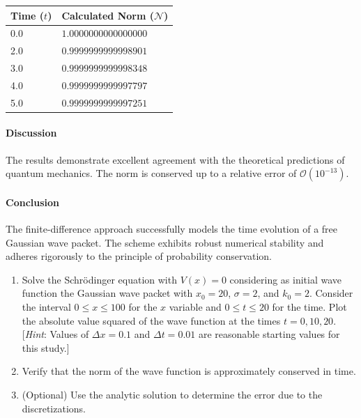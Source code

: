 \begin{solution}
	\begin{center}
		\centering
		\renewcommand{\arraystretch}{1.2}
		\begin{tabular}{ll}
			\toprule
			Time ($t$) & Calculated Norm ($\mathcal{N}$) \\
			\midrule
			0.0                 & $1.0000000000000000$                     \\
			2.0                 & $0.9999999999998901$                     \\
			3.0                 & $0.9999999999998348$                     \\
			4.0                 & $0.9999999999997797$                     \\
			5.0                 & $0.9999999999997251$                     \\
			\bottomrule
		\end{tabular}
		\label{tab:norm_conservation}
	\end{center}

	\paragraph{Discussion}
	The results demonstrate excellent agreement with the theoretical predictions of quantum
	mechanics. The norm is conserved up to a relative error of
	$\mathcal{O}(10^{-13})$.

	\paragraph{Conclusion}
	The finite-difference approach successfully models the time evolution of a
	free Gaussian wave packet. The scheme exhibits robust numerical stability and
	adheres rigorously to the principle of probability conservation.
\end{solution}

\begin{exercise}
	\begin{enumerate}
		\item Solve the Schr\"odinger equation with $V(x)=0$ considering as
		      initial wave function the Gaussian wave packet with $x_0=20$, $\sigma=2$, and
		      $k_0=2$. Consider the interval $0\leq x\leq 100$ for the $x$ variable and $0\leq
			      t\leq 20$ for the time. Plot the absolute value squared of the wave function at
		      the times $t=0,10,20$. [\emph{Hint}: Values of $\Delta x=0.1$ and $\Delta t=0.01$
				      are reasonable starting values for this study.]
		\item Verify that the norm of the wave function is approximately
		      conserved in time.
		\item (Optional) Use the analytic solution to determine the
		      error due to the discretizations.
	\end{enumerate}
\end{exercise}

